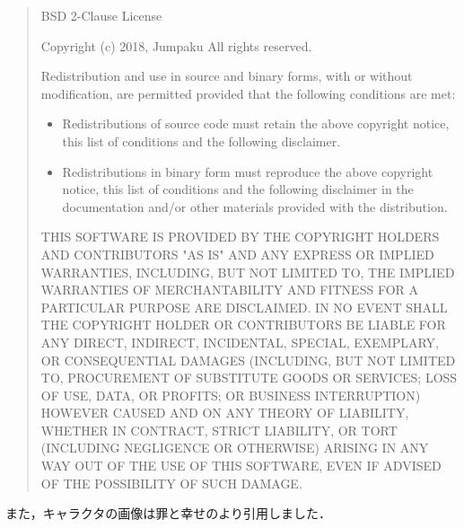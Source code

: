 \begin{quote}
BSD 2-Clause License

Copyright (c) 2018, Jumpaku
All rights reserved.

Redistribution and use in source and binary forms, with or without
modification, are permitted provided that the following conditions are met:
\begin{itemize}
\item Redistributions of source code must retain the above copyright notice, this
  list of conditions and the following disclaimer.
\item Redistributions in binary form must reproduce the above copyright notice,
  this list of conditions and the following disclaimer in the documentation
  and/or other materials provided with the distribution.
\end{itemize}
THIS SOFTWARE IS PROVIDED BY THE COPYRIGHT HOLDERS AND CONTRIBUTORS "AS IS"
AND ANY EXPRESS OR IMPLIED WARRANTIES, INCLUDING, BUT NOT LIMITED TO, THE
IMPLIED WARRANTIES OF MERCHANTABILITY AND FITNESS FOR A PARTICULAR PURPOSE ARE
DISCLAIMED. IN NO EVENT SHALL THE COPYRIGHT HOLDER OR CONTRIBUTORS BE LIABLE
FOR ANY DIRECT, INDIRECT, INCIDENTAL, SPECIAL, EXEMPLARY, OR CONSEQUENTIAL
DAMAGES (INCLUDING, BUT NOT LIMITED TO, PROCUREMENT OF SUBSTITUTE GOODS OR
SERVICES; LOSS OF USE, DATA, OR PROFITS; OR BUSINESS INTERRUPTION) HOWEVER
CAUSED AND ON ANY THEORY OF LIABILITY, WHETHER IN CONTRACT, STRICT LIABILITY,
OR TORT (INCLUDING NEGLIGENCE OR OTHERWISE) ARISING IN ANY WAY OUT OF THE USE
OF THIS SOFTWARE, EVEN IF ADVISED OF THE POSSIBILITY OF SUCH DAMAGE.
\end{quote}

また，キャラクタの画像は罪と幸せのより引用しました．
